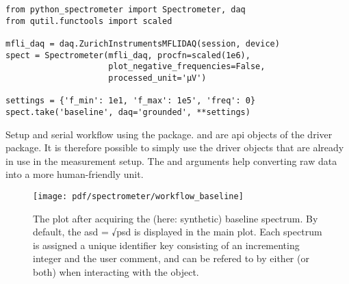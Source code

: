 \begin{listing}[htpb]
    \begin{verbatim}
from python_spectrometer import Spectrometer, daq
from qutil.functools import scaled

mfli_daq = daq.ZurichInstrumentsMFLIDAQ(session, device)
spect = Spectrometer(mfli_daq, procfn=scaled(1e6),
                     plot_negative_frequencies=False,
                     processed_unit='μV')

settings = {'f_min': 1e1, 'f_max': 1e5', 'freq': 0}
spect.take('baseline', daq='grounded', **settings)
    \end{verbatim}
    \caption[\pyspeck serial workflow]{
        Setup and serial workflow using the \pyspeck package.
         and  are \gls{api} objects of the  driver package.
        It is therefore possible to simply use the driver objects that are already in use in the measurement setup.
        The  and  arguments help converting raw data into a more human-friendly unit.
    }
    \label{lst:speck:workflow:serial}
\end{listing}
\begin{figure}
    \centering
    \texttt{[image: pdf/spectrometer/workflow\_baseline]}
    \caption{
        The \pyspeck plot after acquiring the (here: synthetic) baseline spectrum.
        By default, the \gls{asd} = √\gls{psd} is displayed in the main plot.
        Each spectrum is assigned a unique identifier key consisting of an incrementing integer and the user comment, and can be refered to by either (or both) when interacting with the object.
    }
    \label{fig:speck:software:workflow:baseline}
\end{figure}

